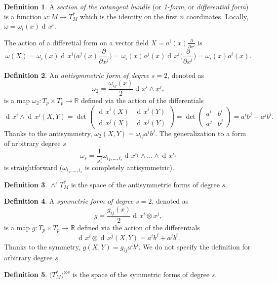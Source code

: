 \documentclass[a4paper,12pt]{book}
\newcommand{\dd}{\mathop{\mathrm{d}\!}{}}
\theoremstyle{definition}
\newtheorem{definition}{Definition}
\theoremstyle{remark}
\begin{document}
\begin{definition}
A \emph{section of the cotangent bundle} (or \emph{1-form}, or \emph{differential form}) is a function $\omega\colon M\to T_M^*$ which is the identity on the first $n$ coordinates. Locally, $\omega=\omega_i(x)\dd x^i$.
\end{definition}

The action of a differetial form on a vector field $X=a^i(x)\frac{\partial}{\partial x^i}$ is
\[\omega(X)=\omega_i(x)\dd x^i\biggl(a^j(x)\frac{\partial}{\partial x^j}\biggr)=\omega_i(x)a^j(x)\dd x^i\biggl(\frac{\partial}{\partial x^i}\biggr)=\omega_i(x)a^i(x).\]

\begin{definition}
An \emph{antisymmetric form of degree $s=2$}, denoted as
\[\omega_2=\frac{\omega_{ij}(x)}{2}\dd x^i\wedge x^j,\] is a map $\omega_2\colon T_p\times T_p\to\mathbb R$ defined via the action of the differentials
\[\dd x^i\wedge \dd x^j(X,Y)=\det
\begin{pmatrix}
\dd x^i(X)& \dd x^i(Y)\\
\dd x^j(X)& \dd x^j(Y)
\end{pmatrix}=\det
\begin{pmatrix}
a^i& b^i\\
a^j& b^j
\end{pmatrix}=a^ib^j-a^jb^i.\]
Thanks to the antisymmetry, $\omega_2(X,Y)=\omega_{ij}a^ib^j$. The generalization to a form of arbitrary degree $s$
\[\omega_s=\frac{1}{s!}\omega_{i_1,\ldots,i_s}\dd x^{i_1}\wedge\ldots\wedge\dd x^{i_s}\]
is straightforward ($\omega_{i_1,\ldots,i_s}$ is completely antisymmetric).
\end{definition}

\begin{definition}
$\wedge^sT_M^*$ is the space of the antisymmetric forms of degree $s$.
\end{definition}

\begin{definition}
A \emph{symmetric form of degree $s=2$}, denoted as
\[g=\frac{g_{ij}(x)}{2}\dd x^i\otimes x^j,\] is a map $g\colon T_p\times T_p\to\mathbb R$ defined via the action of the differentials
\[\dd x^i\otimes \dd x^j(X,Y)=a^ib^j+a^jb^i.\]
Thanks to the symmetry, $g(X,Y)=g_{ij}a^ib^j$. We do not specify the definition for arbitrary degree $s$.
\end{definition}

\begin{definition}
$\bigl(T_M^*\bigr)^{\otimes s}$ is the space of the symmetric forms of degree $s$.
\end{definition}
\end{document}
